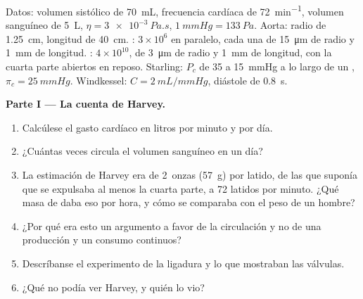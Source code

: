 \begin{problem}
\label{pb:b2:blood-circulation:1}
Datos: volumen sistólico de \qty{70}{mL}, frecuencia cardíaca de
\qty{72}{min^{-1}}, volumen sanguíneo de \qty{5}{L},
$\eta = \qty{3e-3}{Pa.s}$, $\qty{1}{mmHg} =
\qty{133}{Pa}$. Aorta: radio de \qty{1.25}{cm}, longitud de \qty{40}{cm}.
: $3\times 10^{6}$ en paralelo, cada una de \qty{15}{\micro m}
de radio y \qty{1}{mm} de longitud. : $4\times
10^{10}$, de \qty{3}{\micro m} de radio y \qty{1}{mm} de longitud, con la
cuarta parte abiertos en reposo. Starling: $P_c$ de 35 a \qty{15}{mmHg}
a lo largo de un , $\pi_c = \qty{25}{mmHg}$. Windkessel: $C =
\qty{2}{mL/mmHg}$, diástole de \qty{0.8}{s}.

\medskip
\noindent\textbf{Parte I --- La cuenta de Harvey.}
\begin{enumerate}
  \item Calcúlese el gasto cardíaco en litros por minuto y por día.
  \item ¿Cuántas veces circula el volumen sanguíneo en un día?
  \item La estimación de Harvey era de 2~onzas (\qty{57}{g}) por latido,
        de las que suponía que se expulsaba al menos la cuarta parte, a 72
        latidos por minuto. ¿Qué masa de  daba eso por hora, y cómo se
        comparaba con el peso de un hombre?
  \item ¿Por qué era esto un argumento a favor de la circulación y no de
        una producción y un consumo continuos?
  \item Descríbanse el experimento de la ligadura y lo que mostraban las
        válvulas.
  \item ¿Qué no podía ver Harvey, y quién lo vio?
\end{enumerate}


\end{problem}
